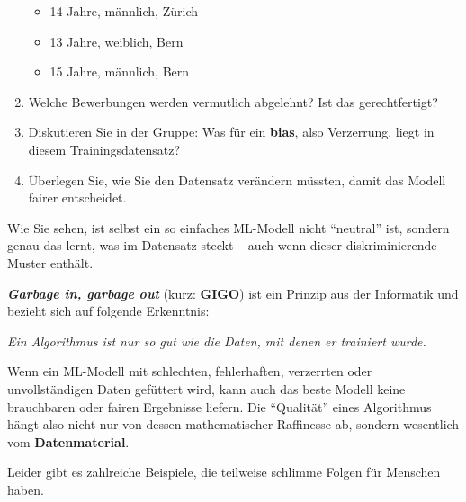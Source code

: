 \begin{lpu}
\begin{aufgabe}{6}
\begin{enumerate}
  \begin{itemize}
    \item 14 Jahre, männlich, Zürich
    \item 13 Jahre, weiblich, Bern
    \item 15 Jahre, männlich, Bern
  \end{itemize}

  \item Welche Bewerbungen werden vermutlich abgelehnt? Ist das gerechtfertigt?
  \item Diskutieren Sie in der Gruppe: Was für ein \textbf{bias}, also Verzerrung, liegt in diesem Trainingsdatensatz?
  \item Überlegen Sie, wie Sie den Datensatz verändern müssten, damit das Modell fairer entscheidet.
\end{enumerate}
\end{aufgabe}

Wie Sie sehen, ist selbst ein so einfaches ML-Modell nicht ``neutral'' ist, sondern genau das lernt, was im Datensatz steckt – auch wenn dieser diskriminierende Muster enthält.

\begin{theorie}

\textbf{\textit{Garbage in, garbage out}} (kurz: \textbf{GIGO}) ist ein Prinzip aus der Informatik und bezieht sich auf folgende Erkenntnis:

\begin{center}
\emph{Ein Algorithmus ist nur so gut wie die Daten, mit denen er trainiert wurde.}
\end{center}

Wenn ein ML-Modell mit schlechten, fehlerhaften, verzerrten oder unvollständigen Daten gefüttert wird, kann auch das beste Modell keine brauchbaren oder fairen Ergebnisse liefern. Die ``Qualität'' eines Algorithmus hängt also nicht nur von dessen mathematischer Raffinesse ab, sondern wesentlich vom \textbf{Datenmaterial}.
\end{theorie}

Leider gibt es zahlreiche Beispiele, die teilweise schlimme Folgen für Menschen haben.


\end{lpu}
